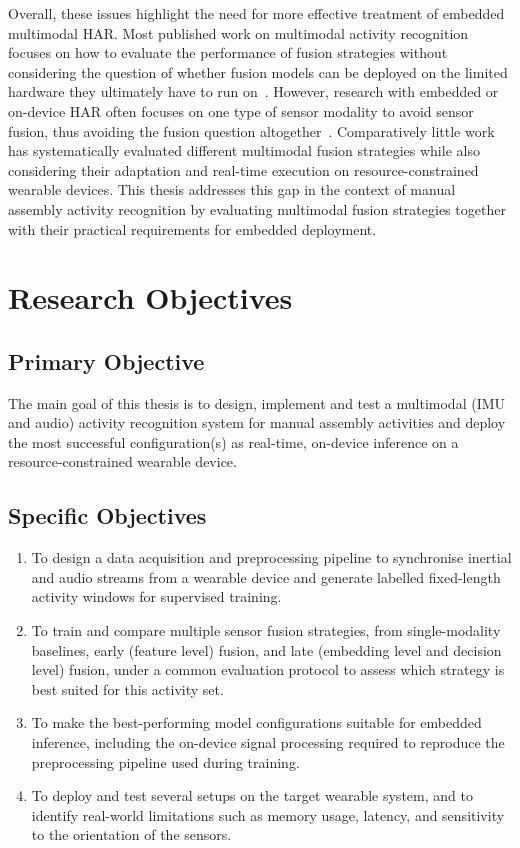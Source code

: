 Overall, these issues highlight the need for more effective treatment of embedded multimodal HAR. Most published work on multimodal activity recognition focuses on how to evaluate the performance of fusion strategies without considering the question of whether fusion models can be deployed on the limited hardware they ultimately have to run on~\cite{alamin2019action, bhattacharya2022leveraging, koch2024recognition}. However, research with embedded or on-device HAR often focuses on one type of sensor modality to avoid sensor fusion, thus avoiding the fusion question altogether~\cite{zhou2025efficient}. Comparatively little work has systematically evaluated different multimodal fusion strategies while also considering their adaptation and real-time execution on resource-constrained wearable devices. This thesis addresses this gap in the context of manual assembly activity recognition by evaluating multimodal fusion strategies together with their practical requirements for embedded deployment.

\section{Research Objectives}

\subsection{Primary Objective}
The main goal of this thesis is to design, implement and test a multimodal (IMU and audio) activity recognition system for manual assembly activities and deploy the most successful configuration(s) as real-time, on-device inference on a resource-constrained wearable device.

\subsection{Specific Objectives}
\begin{enumerate}
    \item To design a data acquisition and preprocessing pipeline to synchronise inertial and audio streams from a wearable device and generate labelled fixed-length activity windows for supervised training.
    \item To train and compare multiple sensor fusion strategies, from single-modality baselines, early (feature level) fusion, and late (embedding level and decision level) fusion, under a common evaluation protocol to assess which strategy is best suited for this activity set.
    \item To make the best-performing model configurations suitable for embedded inference, including the on-device signal processing required to reproduce the preprocessing pipeline used during training.
    \item To deploy and test several setups on the target wearable system, and to identify real-world limitations such as memory usage, latency, and sensitivity to the orientation of the sensors.
\end{enumerate}


